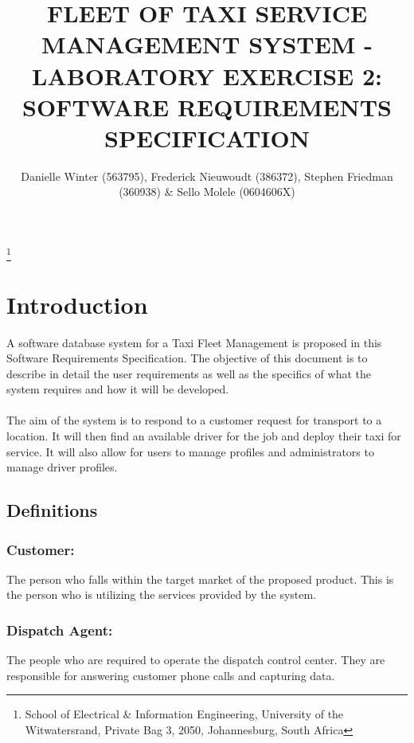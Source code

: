 \documentclass[10pt,twocolumn]{witseiepaper}
\begin{document}
\title{FLEET OF TAXI SERVICE MANAGEMENT SYSTEM - LABORATORY EXERCISE 2: SOFTWARE REQUIREMENTS SPECIFICATION}

\author{Danielle Winter (563795), Frederick Nieuwoudt (386372), Stephen Friedman (360938) \& Sello Molele (0604606X)}
\thanks{School of Electrical \& Information Engineering, University of the
Witwatersrand, Private Bag 3, 2050, Johannesburg, South Africa}


%

\maketitle
\thispagestyle{empty}\pagestyle{empty}


%
\section{Introduction}
A software database system for a Taxi Fleet Management is proposed in this Software Requirements Specification. The objective of this document is to describe in detail the user requirements as well as the specifics of what the system requires and how it will be developed.\\\\
The aim of the system is to respond to a customer request for transport to a location. It will then find an available driver for the job and deploy their taxi for service. It will also allow for users to manage profiles and administrators to manage driver profiles.

\subsection{Definitions}

\subsubsection{Customer:}
The person who falls within the target market of the proposed product. This is the person who is utilizing the services provided by the system.

\subsubsection{Dispatch Agent:}
The people who are required to operate the dispatch control center. They are responsible for answering customer phone calls and capturing data.
\end{document}
